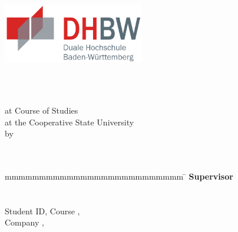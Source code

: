 \begin{titlepage}
	\begin{center}
		\includegraphics[height=2.6cm]{images/dhbw.png}
	\end{center}
	\enlargethispage{20mm}
	\begin{center}
	  \begin{spacing}{2}
	  \vspace*{9mm}	{\Large\bf \titel }\\
	  \end{spacing}
	  \vspace*{8mm}	{\large\bf \arbeit}\\

	  \vspace*{17mm}	at Course of Studies \studiengang\\
	  \vspace*{3mm} 	at the Cooperative State University \dhbw\\
	  \vspace*{12mm}	by\\
	  \vspace*{3mm} 	{\large\bf \autor}\\
	  \vspace*{12mm}	\datumAbgabe\\
	\end{center}
	\vfill
	\begin{spacing}{1.2}
	\begin{tabbing}
		mmmmmmmmmmmmmmmmmmmmmmmmmm     \= \kill
		\textbf{Supervisor}              \>  \betreuer\\
		\\
		\textbf{\autor}\\
		Student ID, Course  \>  \matrikelnr, \kurs\\
		Company      \>  \firma, \firmenort\\
		
		
	\end{tabbing}
	\end{spacing}
\end{titlepage}
